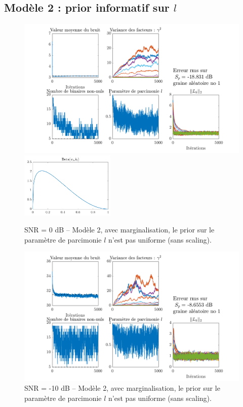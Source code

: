 \documentclass[ 12pt]{article}
\begin{document}
\subsection{Modèle 2 : prior informatif sur $l$}
\begin{figure}[H]
	\centering
	\includegraphics[width=\textwidth]{ToyCase/lsparse.png}\\
	\includegraphics[width=0.4\textwidth]{ToyCase/priorl.png}
	\caption{SNR = 0 dB -- Modèle 2, avec marginalisation, le prior sur le paramètre de parcimonie $l$ n'est pas uniforme (sans scaling).}
\end{figure}
\begin{figure}[H]
	\centering
	\includegraphics[width=\textwidth]{ToyCase/lsparse_snrm10db.png}
	\caption{SNR = -10 dB -- Modèle 2, avec marginalisation, le prior sur le paramètre de parcimonie $l$ n'est pas uniforme (sans scaling).}
\end{figure}
\end{document}

